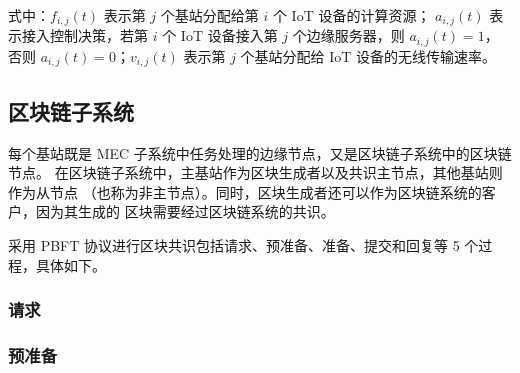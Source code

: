 \noindent 式中：$f_{i,j}(t)$ 表示第 $j$ 个基站分配给第 $i$ 个 IoT 设备的计算资源；
$a_{i,j}(t)$ 表示接入控制决策，若第 $i$ 个 IoT 设备接入第 $j$ 个边缘服务器，则
$a_{i,j}(t)=1$，否则 $a_{i,j}(t)=0$；$v_{i,j}(t)$ 表示第 $j$ 个基站分配给
IoT 设备的无线传输速率。

\dotsline

\subsection{区块链子系统}

每个基站既是 MEC 子系统中任务处理的边缘节点，又是区块链子系统中的区块链节点。
在区块链子系统中，主基站作为区块生成者以及共识主节点，其他基站则作为从节点
（也称为非主节点）。同时，区块生成者还可以作为区块链系统的客户，因为其生成的
区块需要经过区块链系统的共识。

采用 PBFT 协议进行区块共识包括请求、预准备、准备、提交和回复等 5 个过程，具体如下。

\subsubsection{请求}

\dotsline

\subsubsection{预准备}

\dotsline
